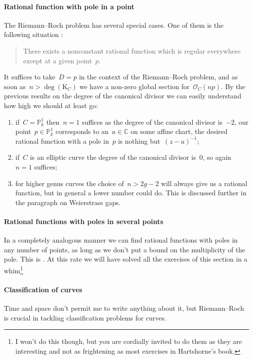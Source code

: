 \documentclass[10pt,a4paper]{article}
\begin{document}
\paragraph{Rational function with pole in a point}
The Riemann--Roch problem has several special cases. One of them is the following situation \cite[exercise IV.1.1]{hartshorne-algebraic-geometry}:
\begin{quote}
  There exists a nonconstant rational function which is regular everywhere except at a given point~$p$.
\end{quote}
It suffices to take~$D=p$ in the context of the Riemann--Roch problem, and as soon as~$n>\deg(\mathrm{K}_C)$ we have a non-zero global section for~$\mathcal{O}_C(np)$. By the previous results on the degree of the canonical divisor we can easily understand how high we should at least go:
\begin{enumerate}
  \item if~$C=\mathbb{P}_k^1$ then~$n=1$ suffices as the degree of the canonical divisor is~$-2$, our point~$p\in\mathbb{P}_k^1$ corresponds to an~$a\in\mathbb{C}$ on some affine chart, the desired rational function with a pole in~$p$ is nothing but~$(z-a)^{-1}$;
  \item if~$C$ is an elliptic curve the degree of the canonical divisor is~$0$, so again~$n=1$ suffices;
  \item for higher genus curves the choice of~$n>2g-2$ will always give us a rational function, but in general a lower number could do. This is discussed further in the paragraph on Weierstrass gaps\checkthis.
\end{enumerate}

\paragraph{Rational functions with poles in several points}
In a completely analogous manner we can find rational functions with poles in any number of points, as long as we don't put a bound on the multiplicity of the pole. This is \cite[exercise IV.1.2]{hartshorne-algebraic-geometry}. At this rate we will have solved all the exercises of this section in a whim\footnote{I won't do this though, but you are cordially invited to do them as they are interesting and not as frightening as most exercises in Hartshorne's book.}

\paragraph{Classification of curves}
Time and space don't permit me to write anything about it, but Riemann--Roch is crucial in tackling classification problems for curves.
\end{document}
